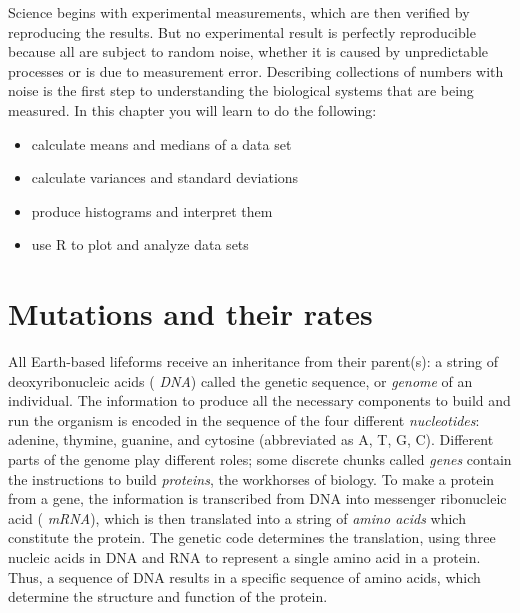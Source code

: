 \documentclass[
]{book}
\theoremstyle{definition}
\theoremstyle{definition}
\theoremstyle{definition}
\theoremstyle{remark}
\begin{document}
Science begins with experimental measurements, which are then verified by reproducing the results. But no experimental result is perfectly reproducible because all are subject to random noise, whether it is caused by unpredictable processes or is due to measurement error. Describing collections of numbers with noise is the first step to understanding the biological systems that are being measured. In this chapter you will learn to do the following:

\begin{itemize}
\item
  calculate means and medians of a data set
\item
  calculate variances and standard deviations
\item
  produce histograms and interpret them
\item
  use R to plot and analyze data sets
\end{itemize}

\hypertarget{mutations-and-their-rates}{%
\section{Mutations and their rates}\label{mutations-and-their-rates}}

\label{sec:bio3}

All Earth-based lifeforms receive an inheritance from their parent(s): a string of deoxyribonucleic acids ( \emph{DNA}) called the genetic sequence, or  \emph{genome} of an individual. The information to produce all the necessary components to build and run the organism is encoded in the sequence of the four different  \emph{nucleotides}: adenine, thymine, guanine, and cytosine (abbreviated as A, T, G, C). Different parts of the genome play different roles; some discrete chunks called \emph{genes} contain the instructions to build  \emph{proteins}, the workhorses of biology. To make a protein from a gene, the information is transcribed from DNA into messenger ribonucleic acid ( \emph{mRNA}), which is then translated into a string of  \emph{amino acids} which constitute the protein. The genetic code determines the translation, using three nucleic acids in DNA and RNA to represent a single amino acid in a protein. Thus, a sequence of DNA results in a specific sequence of amino acids, which determine the structure and function of the protein.
\end{document}
